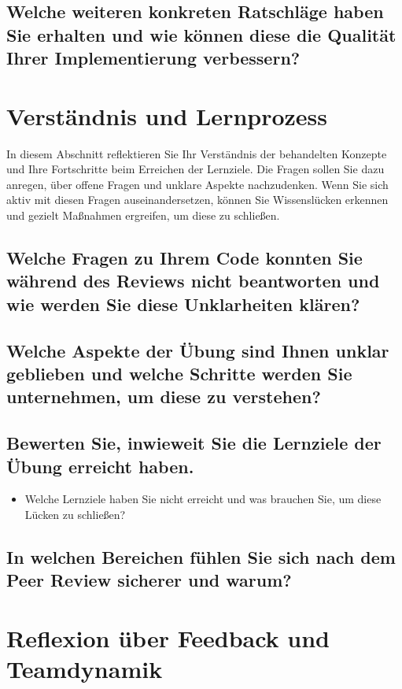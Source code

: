 \documentclass[a4paper,11pt]{article}
\begin{document}
\subsection*{Welche weiteren konkreten Ratschläge haben Sie erhalten und wie können diese die Qualität Ihrer Implementierung verbessern?}

\section*{Verständnis und Lernprozess}

In diesem Abschnitt reflektieren Sie Ihr Verständnis der behandelten Konzepte und Ihre Fortschritte beim Erreichen der Lernziele. Die Fragen sollen Sie dazu anregen, über offene Fragen und unklare Aspekte nachzudenken. Wenn Sie sich aktiv mit diesen Fragen auseinandersetzen, können Sie Wissenslücken erkennen und gezielt Maßnahmen ergreifen, um diese zu schließen.

\subsection*{Welche Fragen zu Ihrem Code konnten Sie während des Reviews nicht beantworten und wie werden Sie diese Unklarheiten klären?}

\subsection*{Welche Aspekte der Übung sind Ihnen unklar geblieben und welche Schritte werden Sie unternehmen, um diese zu verstehen?}

\subsection*{Bewerten Sie, inwieweit Sie die Lernziele der Übung erreicht haben.}
\begin{itemize}
    \item Welche Lernziele haben Sie nicht erreicht und was brauchen Sie, um diese Lücken zu schließen?
\end{itemize}

\subsection*{In welchen Bereichen fühlen Sie sich nach dem Peer Review sicherer und warum?}

\section*{Reflexion über Feedback und Teamdynamik}
\end{document}
